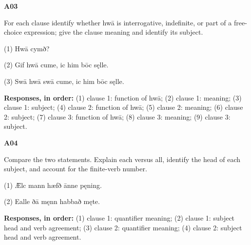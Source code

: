 \par\begin{minipage}{\linewidth}\raggedright
\textbf{A03}

For each clause identify whether hwā is interrogative, indefinite, or part of a free-choice expression; give the clause meaning and identify its subject.

(1) Hwā cymð?

(2) Gif hwā cume, ic him bōc sęlle.

(3) Swā hwā swā cume, ic him bōc sęlle.

\textbf{Responses, in order:} (1) clause 1: function of hwā; (2) clause 1: meaning; (3) clause 1: subject; (4) clause 2: function of hwā; (5) clause 2: meaning; (6) clause 2: subject; (7) clause 3: function of hwā; (8) clause 3: meaning; (9) clause 3: subject.

\end{minipage}\par\addvspace{4pt}

\par\begin{minipage}{\linewidth}\raggedright
\textbf{A04}

Compare the two statements. Explain each versus all, identify the head of each subject, and account for the finite-verb number.

(1) Ǣlc mann hæfð ānne pęning.

(2) Ealle ðā męnn habbað męte.

\textbf{Responses, in order:} (1) clause 1: quantifier meaning; (2) clause 1: subject head and verb agreement; (3) clause 2: quantifier meaning; (4) clause 2: subject head and verb agreement.

\end{minipage}\par\addvspace{4pt}

